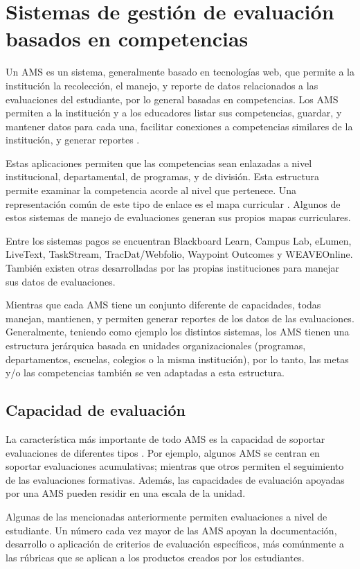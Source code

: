 \section{Sistemas de gestión de evaluación basados en competencias}
Un AMS es un sistema, generalmente basado en tecnologías web, que permite a la institución la recolección, el manejo, y reporte de datos relacionados a las evaluaciones del estudiante, por lo general basadas en competencias. Los AMS permiten a la institución y a los educadores listar sus competencias, guardar, y mantener datos para cada una, facilitar conexiones a competencias similares de la institución, y generar reportes \citep{cartwright2009student}.

Estas aplicaciones permiten que las competencias sean enlazadas a nivel institucional, departamental, de programas, y de división. Esta estructura permite examinar la competencia
acorde al nivel que pertenece. Una representación común de este tipo de enlace es el mapa curricular \citep{oakleaf_choosing_2013}. Algunos de estos sistemas de manejo de evaluaciones generan sus propios mapas curriculares.

Entre los sistemas pagos se encuentran Blackboard Learn, Campus Lab, eLumen, LiveText, TaskStream, TracDat/Webfolio, Waypoint Outcomes y WEAVEOnline. También existen otras desarrolladas por las propias instituciones para manejar sus datos de evaluaciones.

Mientras que cada AMS tiene un conjunto diferente de capacidades, todas manejan, mantienen, y permiten generar reportes de los datos de las evaluaciones. Generalmente, teniendo como ejemplo los distintos sistemas, los AMS tienen una estructura jerárquica basada en unidades organizacionales (programas, departamentos, escuelas, colegios o la misma institución), por lo tanto, las metas y/o las competencias también se ven adaptadas a esta estructura.

\subsection{Capacidad de evaluación}
La característica más importante de todo AMS es la capacidad de soportar evaluaciones de diferentes tipos \citep{oakleaf_choosing_2013}. Por ejemplo, algunos AMS se centran en soportar evaluaciones acumulativas; mientras que otros permiten el seguimiento de las evaluaciones formativas. Además, las capacidades de evaluación apoyadas por una AMS pueden residir en una escala de la unidad.

Algunas de las mencionadas anteriormente permiten evaluaciones a nivel de estudiante. Un número cada vez mayor de las AMS apoyan la documentación, desarrollo o aplicación de criterios de evaluación específicos, más comúnmente a las rúbricas que se aplican a los productos creados por los estudiantes.

